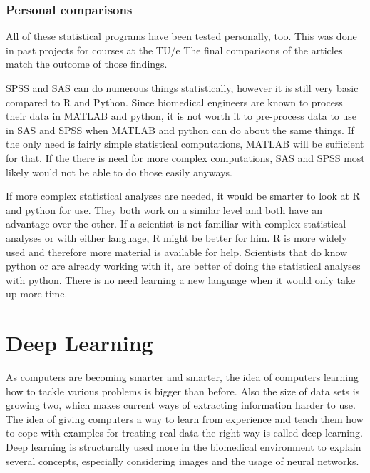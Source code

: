 \documentclass[10pt,a4paper]{article}
\begin{document}
	\subsubsection{Personal comparisons}
	
	All of these statistical programs have been tested personally, too. This 
	was done in past projects for courses at the TU/e The 
	final comparisons of the articles match the outcome of those findings. 
	
	SPSS and SAS can do numerous things statistically, however it is still very 
	basic compared to R and Python. Since biomedical engineers are known to 
	process their data in MATLAB and python, it is not worth it to pre-process 
	data to use in SAS and SPSS when MATLAB and python can do about the same 
	things. If the only need is fairly simple statistical computations, MATLAB 
	will be sufficient for that. If the there is need for more complex 
	computations, SAS and SPSS most likely would not be able to do those easily 
	anyways. 
	
	If more complex statistical analyses are needed, it would be smarter to 
	look at R and python for use. They both work on a similar level and both 
	have an advantage over the other. If a scientist is not familiar with 
	complex statistical analyses or with either language, R might be better for 
	him. R is more widely used and therefore more material is available for 
	help. Scientists that do know python or are already working with it, are 
	better of doing the statistical analyses with python. There is no need 
	learning a new language when it would only take up more time.
	
	\clearpage
	
	\section{Deep Learning}
	
	As computers are becoming smarter and smarter, the idea of computers 
	learning how to tackle various problems is bigger than before. Also the 
	size of data sets is growing two, which makes current ways of extracting 
	information harder to use. The idea of 
	giving computers a way to learn from experience and teach them how to cope 
	with examples for treating real data the right way is called deep learning. 
	\cite{Goodfellow-et-al-2016} Deep learning is structurally used more in the 
	biomedical environment to explain several concepts, especially considering 
	images and the usage of neural networks.\cite{greenspan2016guest}
	
\end{document}
